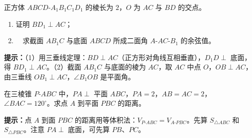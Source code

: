 \documentclass{exam-zh}
\begin{document}

\begin{problem}[points=12]
  \noindent
  \begin{minipage}[t]{\dimexpr\linewidth-70mm-6mm\relax}
    \vspace{0pt}
    正方体 $ABCD\text{-}A_1B_1C_1D_1$ 的棱长为 $2$，$O$ 为 $AC$ 与 $BD$ 的交点。
\ \begin{enumerate}[label=(\arabic*)]
  \item 证明 $BD_1\perp AC$；
  \item\ \ 求截面 $AB_1C$ 与底面 $ABCD$ 所成二面角 $A\text{-}AC\text{-}B_1$ 的余弦值。
\end{enumerate}

    \begin{hintbox}
\textbf{提示：}（1）用三垂线定理：$BD\perp AC$（正方形对角线互相垂直），$D_1D\perp$ 底面，得 $BD_1\perp AC$。（2）截面 $AB_1C$ 与底面的棱为 $AC$，取 $AC$ 中点 $O$，$OB\perp AC$，由三垂线 $OB_1\perp AC$，$\angle B_1OB$ 是平面角。\end{hintbox}

  \end{minipage}\hfill
  \begin{diagramcoltikz}{70mm}{正方体，标出截面 $AB_1C$ 与对角线 $BD_1$。}
  }
  \end{diagramcoltikz}
  \par\medskip
  \answerarea[62mm]
\end{problem}



\begin{problem}[points=14]
  \noindent
  \begin{minipage}[t]{\dimexpr\linewidth-70mm-6mm\relax}
    \vspace{0pt}
    在三棱锥 $P\text{-}ABC$ 中，$PA\perp$ 平面 $ABC$，$PA=2$，$AB=AC=2$，$\angle BAC=120^{\circ}$。求点 $A$ 到平面 $PBC$ 的距离。

    \begin{hintbox}
\textbf{提示：}点 $A$ 到面 $PBC$ 的距离用等体积法：$V_{P\text{-}ABC}=V_{A\text{-}PBC}$。先算 $S_{\triangle ABC}$ 和 $S_{\triangle PBC}$。注意 $PA\perp$ 底面，可先算 $PB$、$PC$。\end{hintbox}

  \end{minipage}\hfill
  \begin{diagramcoltikz}{70mm}{三棱锥，标出 $PA\perp$ 底面及点 $A$ 到面 $PBC$ 的距离。}
  }
  \end{diagramcoltikz}
  \par\medskip
  \answerarea[70mm]
\end{problem}
\end{document}
